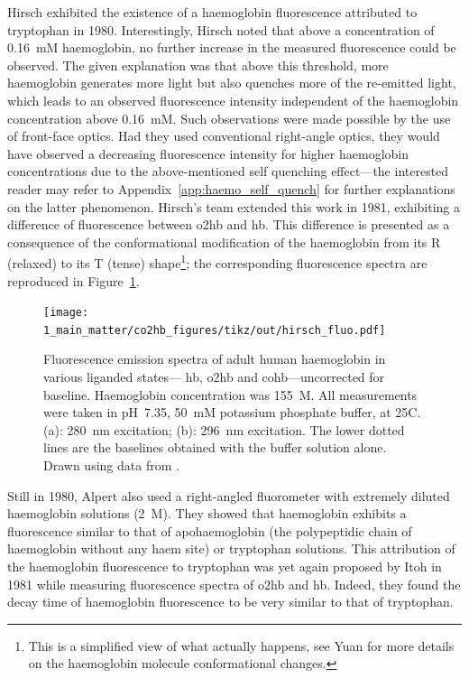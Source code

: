 Hirsch \etal{} exhibited the existence of a haemoglobin fluorescence attributed to tryptophan in 1980\cite{hirsch1980}. Interestingly, Hirsch noted that above a concentration of 0.16~mM haemoglobin, no further increase in the measured fluorescence could be observed. The given explanation was that above this threshold, more haemoglobin generates more light but also quenches more of the re-emitted light, which leads to an observed fluorescence intensity independent of the haemoglobin concentration above 0.16~mM. Such observations were made possible by the use of front-face optics. Had they used conventional right-angle optics, they would have observed a decreasing fluorescence intensity for higher haemoglobin concentrations due to the above-mentioned self quenching effect---the interested reader may refer to Appendix~\ref{app:haemo_self_quench} for further explanations on the latter phenomenon. Hirsch's team extended this work in 1981\cite{hirsch1981}, exhibiting a difference of fluorescence between \gls{o2hb} and \gls{hb}. This difference is presented as a consequence of the conformational modification of the haemoglobin from its R (relaxed) to its T (tense) shape\footnote{This is a simplified view of what actually happens, see Yuan \etal{} for more details on the haemoglobin molecule conformational changes\cite{yuan2015}.}; the corresponding fluorescence spectra are reproduced in Figure~\ref{fig:co2hb:hirsch1981_fluo}.

\begin{figure}
	\centering
	\texttt{[image: 1\_main\_matter/co2hb\_figures/tikz/out/hirsch\_fluo.pdf]}
	\caption[Fluorescence emission spectra of adult human haemoglobin in various liganded states.]{Fluorescence emission spectra of adult human haemoglobin in various liganded states---\ie{} \gls{hb}, \gls{o2hb} and \gls{cohb}---uncorrected for baseline. Haemoglobin concentration was 155~\textmu{}M. All measurements were taken in pH~7.35, 50~mM potassium phosphate buffer, at 25{\degree}C. (a): 280~nm excitation; (b): 296~nm excitation. The lower dotted lines are the baselines obtained with the buffer solution alone. Drawn using data from \cite{hirsch1981}.}
	\label{fig:co2hb:hirsch1981_fluo}
\end{figure}

Still in 1980, Alpert \etal{} also used a right-angled fluorometer with extremely diluted haemoglobin solutions (2~\textmu{}M)\cite{alpert1980}. They showed that haemoglobin exhibits a fluorescence similar to that of apohaemoglobin (the polypeptidic chain of haemoglobin without any haem site) or tryptophan solutions. This attribution of the haemoglobin fluorescence to tryptophan was yet again proposed by Itoh \etal{} in 1981\cite{itoh1981} while measuring fluorescence spectra of \gls{o2hb} and \gls{hb}. Indeed, they found the decay time of haemoglobin fluorescence to be very similar to that of tryptophan.

